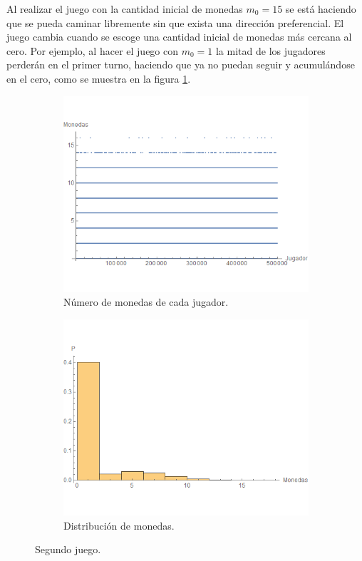 \documentclass[letterpaper,11pt]{article}
\begin{document}
Al realizar el juego con la cantidad inicial de monedas $m_0 = 15$ se está haciendo que se pueda caminar libremente sin que exista una dirección preferencial. El juego cambia cuando se escoge una cantidad inicial de monedas más cercana al cero. Por ejemplo, al hacer el juego con $m_0 = 1$ la mitad de los jugadores perderán en el primer turno, haciendo que ya no puedan seguir y acumulándose en el cero, como se muestra en la figura \ref{fig:Juego2}.
\begin{figure}[h!]
\begin{subfigure}{.5\textwidth}
	\centering
	\includegraphics[scale=0.5]{img/Fig2}
	\caption{Número de monedas de cada jugador.}
\end{subfigure}%
\begin{subfigure}{.5\textwidth}
	\centering
	\includegraphics[scale=0.5]{img/Fig4}
	\caption{Distribución de monedas.}
\end{subfigure}%
\caption{Segundo juego.}
\label{fig:Juego2}
\end{figure}
\end{document}
